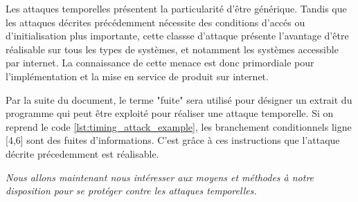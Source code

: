 Les attaques temporelles présentent la particularité d'être générique. Tandis que les attaques décrites précédemment nécessite des conditions d'accés ou d'initialisation plus importante, cette classse d'attaque présente l'avantage d'être réalisable sur tous les types de systèmes, et notamment les systèmes accessible par internet. La connaissance de cette menace est donc primordiale pour l'implémentation et la mise en service de produit sur internet.\medbreak

Par la suite du document, le terme "fuite" sera utilisé pour désigner un extrait du programme qui peut être exploité pour réaliser une attaque temporelle. Si on reprend le code \ref{lst:timing_attack_example}, les branchement conditionnels ligne [4,6] sont des fuites d'informations. C'est grâce à ces instructions que l'attaque décrite précedemment est réalisable.\medbreak

\textit{Nous allons maintenant nous intéresser aux moyens et méthodes à notre disposition pour se protéger contre les attaques temporelles.}